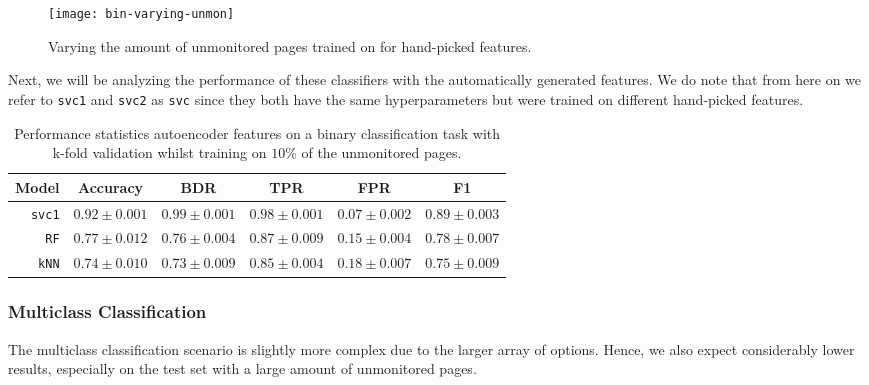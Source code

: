 \begin{figure}[ht]
  \centering
  \texttt{[image: bin-varying-unmon]}
  \caption{Varying the amount of unmonitored pages trained on for hand-picked features.}
  \label{fig:bin-varying-unmon}
\end{figure}

Next, we will be analyzing the performance of these classifiers with the automatically generated features.
We do note that from here on we refer to \texttt{svc1} and \texttt{svc2} as \texttt{svc} since they both have the same hyperparameters but were trained on different hand-picked features.

\begin{table}[ht]
  \centering
  \begin{tabular}{ r  r  r  r  r  r } \hline
    \multicolumn{1}{c}{\textbf{Model}} & \multicolumn{1}{c}{\textbf{Accuracy}} & \multicolumn{1}{c}{\textbf{BDR}} & \multicolumn{1}{c}{\textbf{TPR}} &
      \multicolumn{1}{c}{\textbf{FPR}} & \multicolumn{1}{c}{\textbf{F1}} \\ \hline

    \texttt{svc1} & $0.92 \pm 0.001$ & $0.99 \pm 0.001$ & $0.98 \pm 0.001$ & $0.07 \pm 0.002$ & $0.89 \pm 0.003$ \\

    \texttt{RF} & $0.77 \pm 0.012$ & $0.76 \pm 0.004$ & $0.87 \pm 0.009$ & $0.15 \pm 0.004$ & $0.78 \pm 0.007$ \\

    \texttt{kNN} & $0.74 \pm 0.010$ & $0.73 \pm 0.009$ & $0.85 \pm 0.004$ & $0.18 \pm 0.007$ & $0.75 \pm 0.009$ \\

    \hline
  \end{tabular}
  \caption{Performance statistics autoencoder features on a binary classification task with k-fold validation whilst training on $10\%$ of the unmonitored pages.}
  \label{table:ae-bin}
\end{table}


\subsubsection{Multiclass Classification}

The multiclass classification scenario is slightly more complex due to the larger array of options.
Hence, we also expect considerably lower results, especially on the test set with a large amount of unmonitored pages.

